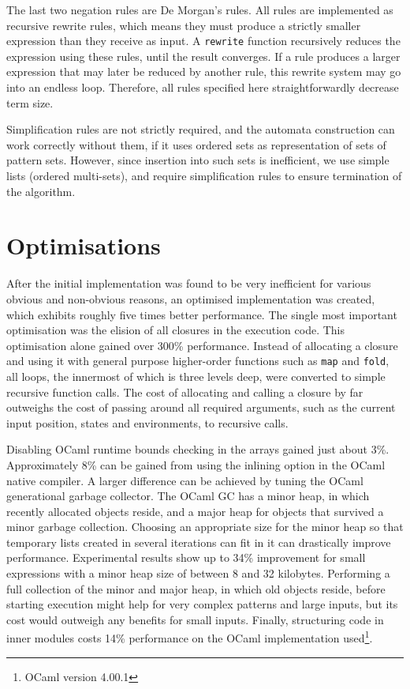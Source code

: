 The last two negation rules are De Morgan's rules. All rules are implemented as
recursive rewrite rules, which means they must produce a strictly smaller
expression than they receive as input. A \texttt{rewrite} function recursively
reduces the expression using these rules, until the result converges. If a rule
produces a larger expression that may later be reduced by another rule, this
rewrite system may go into an endless loop. Therefore, all rules specified here
straightforwardly decrease term size.

\begin{rem}
   Simplification rules are not strictly required, and the automata construction
   can work correctly without them, if it uses ordered sets as representation of
   sets of pattern sets. However, since insertion into such sets is inefficient,
   we use simple lists (ordered multi-sets), and require simplification rules to
   ensure termination of the algorithm.
\end{rem}


\section{Optimisations}
\label{opts}

After the initial implementation was found to be very inefficient for various
obvious and non-obvious reasons, an optimised implementation was created, which
exhibits roughly five times better performance. The single most important
optimisation was the elision of all closures in the execution code. This
optimisation alone gained over 300\% performance. Instead of allocating a
closure and using it with general purpose higher-order functions such as
\texttt{map} and \texttt{fold}, all loops, the innermost of which is three
levels deep, were converted to simple recursive function calls. The cost of
allocating and calling a closure by far outweighs the cost of passing around all
required arguments, such as the current input position, states and
environments, to recursive calls.

Disabling OCaml runtime bounds checking in the arrays gained just about 3\%.
Approximately 8\% can be gained from using the inlining option in the OCaml
native compiler. A larger difference can be achieved by tuning the OCaml
generational garbage collector. The OCaml GC has a minor heap, in which recently
allocated objects reside, and a major heap for objects that survived a minor
garbage collection. Choosing an appropriate size for the minor heap so that
temporary lists created in several iterations can fit in it can drastically
improve performance. Experimental results show up to 34\% improvement for small
expressions with a minor heap size of between 8 and 32 kilobytes. Performing a
full collection of the minor and major heap, in which old objects reside, before
starting execution might help for very complex patterns and large inputs, but
its cost would outweigh any benefits for small inputs. Finally, structuring code
in inner modules costs 14\% performance on the OCaml implementation
used\footnote{OCaml version 4.00.1}.

